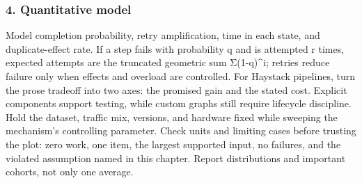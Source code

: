 \subsubsection*{4. Quantitative model}
Model completion probability, retry amplification, time in each state, and duplicate-effect rate. If a step fails with probability q and is attempted r times, expected attempts are the truncated geometric sum Σ(1-q)\textasciicircum{}i; retries reduce failure only when effects and overload are controlled.
For Haystack pipelines, turn the prose tradeoff into two axes: the promised gain and the stated cost. Explicit components support testing, while custom graphs still require lifecycle discipline. Hold the dataset, traffic mix, versions, and hardware fixed while sweeping the mechanism's controlling parameter.
Check units and limiting cases before trusting the plot: zero work, one item, the largest supported input, no failures, and the violated assumption named in this chapter. Report distributions and important cohorts, not only one average.

